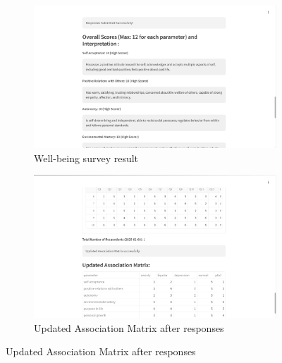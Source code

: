 \begin{figure}[H]
    \begin{subfigure}[b]{0.495\textwidth}
        \centering
        \includegraphics[width=\textwidth]{App Images/30 Interface.png}
        \caption{Well-being survey result}
        \label{fig:wellbeing_questions}
    \end{subfigure}
    \hfill
    \begin{subfigure}[b]{0.495\textwidth}
        \centering
        \includegraphics[width=\textwidth]{App Images/31 Interface.png}
        \caption{Updated Association Matrix after responses}
        \label{fig:wellbeing_result}
    \end{subfigure}
  
    \vspace{1em}


\end{figure}
